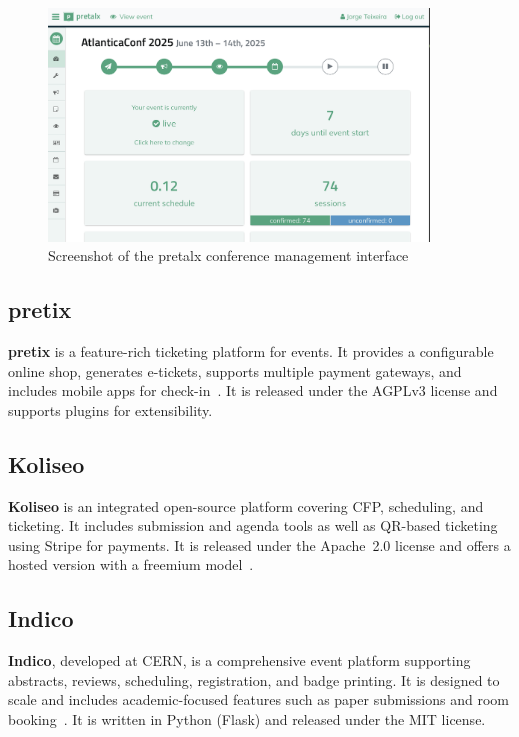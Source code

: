 \begin{figure}[H]
  \centering
  \includegraphics[width=0.9\textwidth]{imaxes/pretalx.com-ui.png}
  \caption{Screenshot of the pretalx conference management interface}
  \label{fig:pretalx-ui}
\end{figure}

\subsection*{pretix}
\textbf{pretix} is a feature-rich ticketing platform for events. It provides a configurable online shop, generates e-tickets, supports multiple payment gateways, and includes mobile apps for check-in~\cite{pretix-docs}. It is released under the AGPLv3 license and supports plugins for extensibility.

\subsection*{Koliseo}
\textbf{Koliseo} is an integrated open-source platform covering CFP, scheduling, and ticketing. It includes submission and agenda tools as well as QR-based ticketing using Stripe for payments. It is released under the Apache~2.0 license and offers a hosted version with a freemium model~\cite{koliseo-website}.

\subsection*{Indico}
\textbf{Indico}, developed at CERN, is a comprehensive event platform supporting abstracts, reviews, scheduling, registration, and badge printing. It is designed to scale and includes academic-focused features such as paper submissions and room booking~\cite{indico-github}. It is written in Python (Flask) and released under the MIT license.

